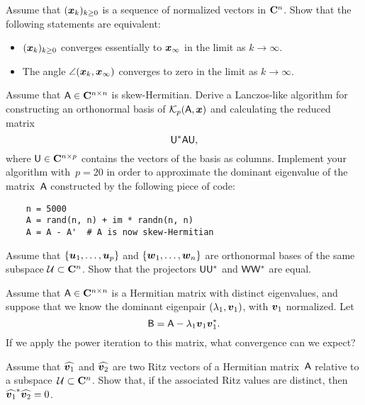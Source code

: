 \begin{exercise}
    Assume that $(\mathbf{\boldsymbol{x}}_k)_{k \geq 0}$ is a sequence of normalized vectors in $\mathbf C^n$.
    Show that the following statements are equivalent:
    \begin{itemize}
        \item $(\mathbf{\boldsymbol{x}}_k)_{k \geq 0}$ converges essentially to $\mathbf{\boldsymbol{x}}_{\infty}$ in the limit as $k \to \infty$.
        \item The angle $\angle(\mathbf{\boldsymbol{x}}_k, \mathbf{\boldsymbol{x}}_{\infty})$ converges to zero in the limit as $k \to \infty$.
    \end{itemize}
\end{exercise}

\begin{exercise}
    Assume that $\mathsf A \in \mathbf C^{n \times n}$ is skew-Hermitian.
    Derive a Lanczos-like algorithm for constructing an orthonormal basis of $\mathcal K_p(\mathsf A, \mathbf{\boldsymbol{x}})$
    and calculating the reduced matrix
    \[
        \mathsf U^* \mathsf A \mathsf U,
    \]
    where $\mathsf U \in \mathbf C^{n \times p}$ contains the vectors of the basis as columns.
    Implement your algorithm with~$p = 20$ in order to approximate the dominant eigenvalue of the matrix~$\mathsf A$ constructed by the following piece of code:
    \begin{verbatim}
    n = 5000
    A = rand(n, n) + im * randn(n, n)
    A = A - A'  # A is now skew-Hermitian
    \end{verbatim}
\end{exercise}

\begin{exercise}
    Assume that $\{\mathbf{\boldsymbol{u}}_1, \dotsc, \mathbf{\boldsymbol{u}}_p \}$ and $\{\mathbf{\boldsymbol{w}}_1, \dotsc, \mathbf{\boldsymbol{w}}_n\}$
    are orthonormal bases of the same subspace $\mathcal U \subset \mathbf C^n$.
    Show that the projectors $\mathsf U \mathsf U^*$ and $\mathsf W \mathsf W^*$ are equal.
\end{exercise}

\begin{exercise}
    Assume that $\mathsf A \in \mathbf C^{n \times n}$ is a Hermitian matrix with distinct eigenvalues,
    and suppose that we know the dominant eigenpair $(\lambda_1, \mathbf{\boldsymbol{v}}_1)$,
    with $\mathbf{\boldsymbol{v}}_1$ normalized.
    Let
    \[
        \mathsf B = \mathsf A - \lambda_1 \mathbf{\boldsymbol{v}}_1 \mathbf{\boldsymbol{v}}_1^*.
    \]
    If we apply the power iteration to this matrix,
    what convergence can we expect?
\end{exercise}

\begin{exercise}
    Assume that $\widehat{\mathbf{\boldsymbol{v}}_1}$ and $\widehat{\mathbf{\boldsymbol{v}}_2}$ are two Ritz vectors of a Hermitian matrix~$\mathsf A$ relative to a subspace~$\mathcal U \subset \mathbf C^n$.
    Show that, if the associated Ritz values are distinct,
    then $\widehat{\mathbf{\boldsymbol{v}}_1}^* \widehat{\mathbf{\boldsymbol{v}}_2} = 0$.
\end{exercise}
